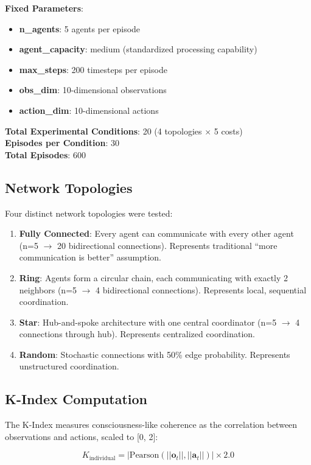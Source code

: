 \documentclass[10pt,letterpaper]{article}
\begin{document}
\textbf{Fixed Parameters}:
\begin{itemize}
\item \textbf{n\_agents}: 5 agents per episode
\item \textbf{agent\_capacity}: medium (standardized processing capability)
\item \textbf{max\_steps}: 200 timesteps per episode
\item \textbf{obs\_dim}: 10-dimensional observations
\item \textbf{action\_dim}: 10-dimensional actions
\end{itemize}

\textbf{Total Experimental Conditions}: 20 (4 topologies $\times$ 5 costs)\\
\textbf{Episodes per Condition}: 30\\
\textbf{Total Episodes}: 600

\subsection*{Network Topologies}
Four distinct network topologies were tested:

\begin{enumerate}
\item \textbf{Fully Connected}: Every agent can communicate with every other agent (n=5 $\rightarrow$ 20 bidirectional connections). Represents traditional ``more communication is better'' assumption.
\item \textbf{Ring}: Agents form a circular chain, each communicating with exactly 2 neighbors (n=5 $\rightarrow$ 4 bidirectional connections). Represents local, sequential coordination.
\item \textbf{Star}: Hub-and-spoke architecture with one central coordinator (n=5 $\rightarrow$ 4 connections through hub). Represents centralized coordination.
\item \textbf{Random}: Stochastic connections with 50\% edge probability. Represents unstructured coordination.
\end{enumerate}

\subsection*{K-Index Computation}
The K-Index measures consciousness-like coherence as the correlation between observations and actions, scaled to [0, 2]:

\begin{equation}
K_{\text{individual}} = |\text{Pearson}(||\mathbf{o}_t||, ||\mathbf{a}_t||)| \times 2.0
\end{equation}
\end{document}

